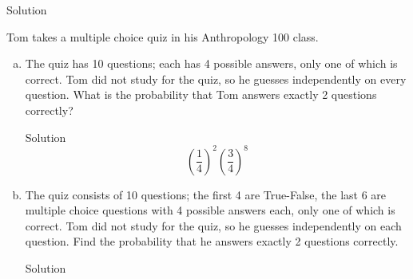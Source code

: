 \documentclass{article}
\begin{document}
\begin{spacing}{1.1}
\begin{homeworkProblem}
\begin{enumerate}[(a)]
\begin{homeworkSection}{Solution}
			\end{homeworkSection}
	\end{enumerate}
\end{homeworkProblem}
\begin{homeworkProblem}
	Tom takes a multiple choice quiz in his Anthropology 100 class.
	\begin{enumerate}[(a)]
		\item The quiz has 10 questions; each has 4 possible answers, only one of which is correct.
Tom did not study for the quiz, so he guesses independently on every question. What is the probability that Tom answers exactly 2 questions correctly?
			\begin{homeworkSection}{Solution}
				\[{\left( {\frac{1}{4}} \right)^2}{\left( {\frac{3}{4}} \right)^8}\]
			\end{homeworkSection}
		\item The quiz consists of 10 questions; the first 4 are True-False, the last 6 are multiple choice questions with 4 possible answers each, only one of which is correct. Tom did not study for the quiz, so he guesses independently on each question. Find the probability that he answers exactly 2 questions correctly.
			\begin{homeworkSection}{Solution}
		

\end{homeworkSection}
\end{enumerate}
\end{homeworkProblem}
\end{spacing}
\end{document}
